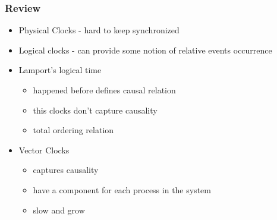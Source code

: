 \documentclass[aspectratio=169, 15pt,usenames,dvipsnames]{beamer}
\begin{document}

	\begin{gdblank}
		\frametitle{Review}
		\begin{itemize}
			\large
			\item Physical Clocks - hard to keep synchronized
			\item Logical clocks - can provide some notion of relative events occurrence
			\item Lamport's logical time
			      \begin{itemize}
			      	\item happened before defines causal relation
			      	\item this clocks don't capture causality
			      	\item total ordering relation
			      \end{itemize}
			\item Vector Clocks
			      \begin{itemize}
			      	\item captures causality
			      	\item have a component for each process in the system
			      	\item slow and grow
			      \end{itemize}
		\end{itemize}
	\end{gdblank} 
\end{document}
